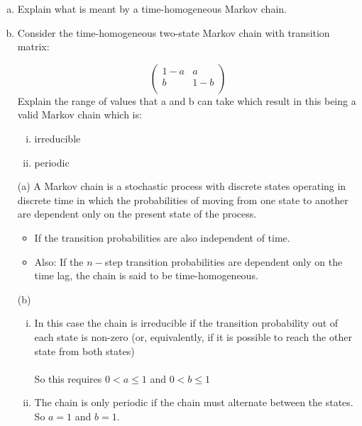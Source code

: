 \documentclass[a4paper,12pt]{article}
\begin{document}
\large
\begin{enumerate}[(a)]
\item 
Explain what is meant by a time-homogeneous Markov chain.

\item Consider the time-homogeneous two-state Markov chain with transition matrix:

\[
\begin{pmatrix}
1 - a & a \\
b & 1 - b \\
\end{pmatrix}
\]
\noindent Explain the range of values that a and b can take which result in this being a
valid Markov chain which is:
\begin{enumerate}[(i)]
\item  irreducible
\item periodic
\end{enumerate}
\end{enumerate}

\newpage


\begin{itemize}
\item[(a)]
A Markov chain is a stochastic process with discrete states operating in discrete time in which the probabilities of moving from one state to another
are dependent only on the present state of the process.
\begin{itemize}
    \item If the transition probabilities are also independent of time.
\item Also: If the $n-$step transition probabilities are dependent only on the time lag, the
chain is said to be time-homogeneous.
\end{itemize}

\item[(b)]

\begin{enumerate}[(i)]
\item In this case the chain is irreducible if the transition probability out of each state is non-zero (or, equivalently, if it is possible to
reach the other state from both states)
\\\\
So this requires $0 < a \leq 1$ and $0 < b \leq 1$
\item 
The chain is only periodic if the chain must alternate between
the states.
So $a = 1$ and $b = 1$.
\end{enumerate}
\end{itemize}
\end{document}
